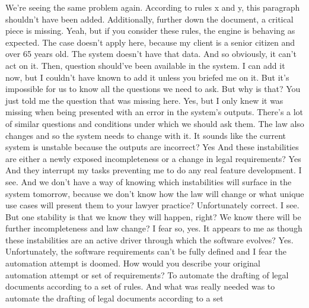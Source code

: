 \begin{dialogue}
     We're seeing the same problem again. According to rules x and y, this paragraph shouldn't have
    been added. Additionally, further down the document, a critical piece is missing.
     Yeah, but if you consider these rules, the engine is behaving as expected.
     The case doesn't apply here, because my client is a senior citizen and over 65 years old.
     The system doesn't have that data. And so obviously, it can't act on it.
     Then, question should've been available in the system.
     I can add it now, but I couldn't have known to add it unless you briefed me on it.
     But it's impossible for us to know all the questions we need to ask.
     But why is that? You just told me the question that was missing here.
     Yes, but I only knew it was missing when being presented with an error in the system's outputs.
    There's a lot of similar questions and conditions under which we should ask them. The law also changes and so the
    system needs to change with it.
     It sounds like the current system is unstable because the outputs are incorrect?
     Yes
     And these instabilities are either a newly exposed incompleteness or a change in legal
    requirements?
     Yes
     And they interrupt my tasks preventing me to do any real feature development.
     I see. And we don't have a way of knowing which instabilities will surface in the system
    tomorrow, because we don't know how the law will change or what unique use cases will present them to your lawyer
    practice?
     Unfortunately correct.
     I see. But one stability is that we know they will happen, right? We know there will be
    further incompleteness and law change?
     I fear so, yes.
     It appears to me as though these instabilities are an active driver through which the
    software evolves?
     Yes. Unfortunately, the software requirements can't be fully defined and I fear the automation
    attempt is doomed.
     How would you describe your original automation attempt or set of requirements?
     To automate the drafting of legal documents according to a set of rules.
     And what was really needed was to automate the drafting of legal documents according to a set

\end{dialogue}
